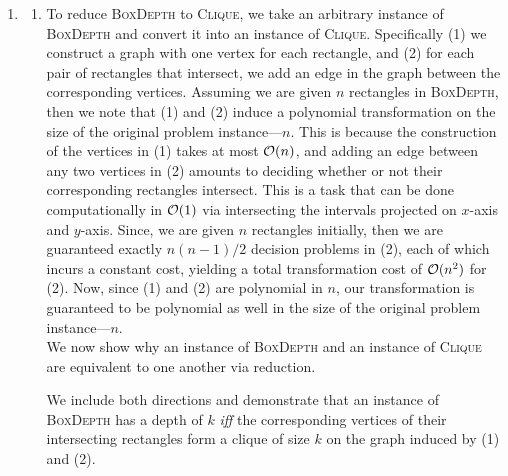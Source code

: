 \documentclass{article}
\begin{document}
\begin{enumerate}[leftmargin={*}, font={\bf}, label={\arabic*.}, ref={\arabic*}]
  \item \label{qst:1}
    \begin{enumerate}[ref={(\alph*)}]
      \item \label{qst:1a}
        To reduce \textsc{BoxDepth} to \textsc{Clique}, we take an arbitrary instance of
        \textsc{BoxDepth} and convert it into an instance of \textsc{Clique}. Specifically
        (1) we construct a graph with one vertex for each rectangle, and (2) for each pair
        of rectangles that intersect, we add an edge in the graph between the corresponding
        vertices. Assuming we are given $n$ rectangles in \textsc{BoxDepth}, then we note
        that (1) and (2) induce a polynomial transformation on the size of the original
        problem instance---$n$. This is because the construction of the vertices in (1)
        takes at most $\operatorname*{\mathcal{O}}(n)$, and adding an edge between any two vertices in (2) amounts to
        deciding whether or not their corresponding rectangles intersect. This is a task
        that can be done computationally in $\operatorname*{\mathcal{O}}(1)$ via intersecting the intervals projected
        on $x$-axis and $y$-axis. Since, we are given $n$ rectangles initially, then we are
        guaranteed exactly $n(n-1)/2$ decision problems in (2), each of which incurs a constant
        cost, yielding a total transformation cost of $\operatorname*{\mathcal{O}}(n^2)$ for (2). Now, since (1) and
        (2) are polynomial in $n$, our transformation is guaranteed to be polynomial as well
        in the size of the original problem instance---$n$. \\

        We now show why an instance of \textsc{BoxDepth} and an instance of \textsc{Clique}
        are equivalent to one another via reduction. \\

        \begin{proof*}
          We include both directions and demonstrate that an instance of \textsc{BoxDepth}
          has a depth of $k$ \textit{iff} the corresponding vertices of their intersecting
          rectangles form a clique of size $k$ on the graph induced by (1) and (2).
\end{proof*}
\end{enumerate}
\end{enumerate}
\end{document}
